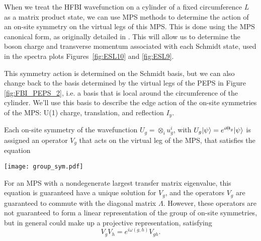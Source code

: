 When we treat the HFBI wavefunction on a
cylinder of a fixed circumference $L$ as a matrix product state, we can use
MPS methods to determine the action of an on-site symmetry on
the virtual legs of this MPS. This is done using the MPS canonical form, as
originally detailed in \cite{perezgarcia2008}. This will allow us to determine
the boson charge and transverse momentum associated with each Schmidt state,
used in the spectra plots Figures~\ref{fig:ESL10} and \ref{fig:ESL9}.

This symmetry action is determined on the Schmidt basis, but we can also
change back to the basis determined by the virtual legs of the PEPS in Figure
\ref{fig:FBI_PEPS_2}, i.e. a basis that is local around the circumference of
the cylinder. We'll use this basis to describe the edge action of the on-site
symmetries of the MPS: U(1) charge, translation, and reflection $I_y$.

Each on-site symmetry of the wavefunction $U_g = \otimes_i u^i_g$, with $U_g
\vert \psi \rangle = e^{i \Theta_g} \vert \psi \rangle$ is assigned an operator $V_g$ that
acts on the virtual leg of the MPS, that satisfies the equation
\begin{center}
\texttt{[image: group\_sym.pdf]}
\end{center}

For an MPS with a nondegenerate largest
transfer matrix eigenvalue, this equation is guaranteed have a unique solution
for $V_g$, and the operators $V_g$ are guaranteed to commute with the diagonal
matrix $\Lambda$. However, these operators are not guaranteed to form a linear
representation of the group of on-site symmetries, but in general could make
up a projective representation, satisfying
$$V_g V_h = e^{i \omega(g, h)} V_{gh}.$$






